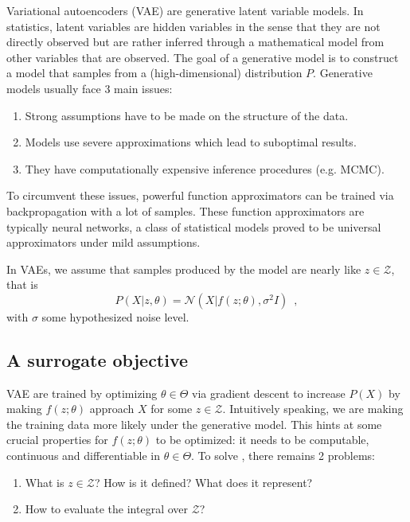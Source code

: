 \documentclass[12pt]{article}
\begin{document}
Variational autoencoders (VAE) are generative latent variable models.
In statistics, latent variables are hidden variables in the sense that they are not directly observed but are rather inferred through a mathematical model from other variables that are observed.
The goal of a generative model is to construct a model that samples from a (high-dimensional) distribution $P$.
Generative models usually face 3 main issues:
%
\begin{enumerate}
    \item Strong assumptions have to be made on the structure of the data.
    \item Models use severe approximations which lead to suboptimal results.
    \item They have computationally expensive inference procedures (e.g. MCMC).
\end{enumerate}
%
To circumvent these issues, powerful function approximators can be trained via backpropagation with a lot of samples.
These function approximators are typically neural networks, a class of statistical models proved to be universal approximators under mild assumptions.

In VAEs, we assume that samples produced by the model are nearly like $z \in \mathcal{Z}$, that is
%
\begin{equation}
    P(X \vert z, \theta) = \mathcal{N}(X \vert f(z;\theta), \sigma^2 I)
    \enspace ,
\end{equation}
%
with $\sigma$ some hypothesized noise level.
%
\subsection{A surrogate objective}
%
VAE are trained by optimizing $\theta \in \Theta$ via gradient descent to increase $P(X)$ by making $f(z;\theta)$ approach $X$ for some $z \in \mathcal{Z}$.
Intuitively speaking, we are making the training data more likely under the generative model.
This hints at some crucial properties for $f(z;\theta)$ to be optimized: it needs to be computable, continuous and differentiable in $\theta \in \Theta$.
To solve , there remains 2 problems:
%
\begin{enumerate}
    \item What is $z \in \mathcal{Z}$? How is it defined? What does it represent?
    \item How to evaluate the integral over $\mathcal{Z}$?
\end{enumerate}
%
\end{document}
